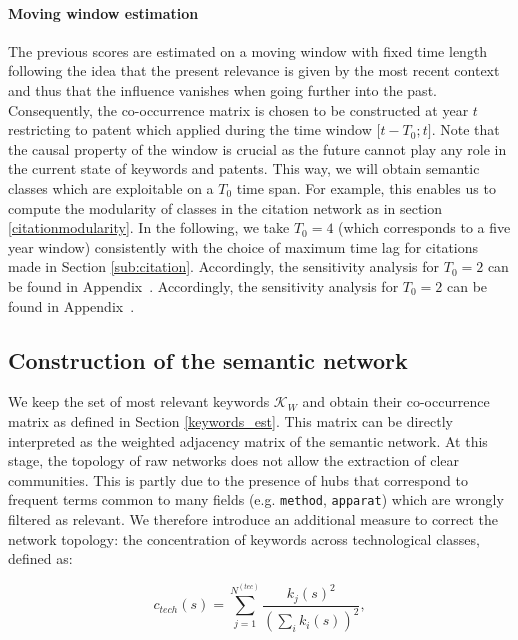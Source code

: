\documentclass[article]{article}%
\begin{document}
\paragraph{Moving window estimation}
The previous scores are estimated on a moving window with fixed time length following the idea that the present relevance is given by the most recent context and thus that the influence vanishes when going further into the past. Consequently, the co-occurrence matrix is chosen to be constructed at year $t$ restricting to patent which applied during the time window $\big[ t - T_0 ; t \big]$. Note that the causal property of the window is crucial as the future cannot play any role in the current state of keywords and patents. This way, we will obtain semantic classes which are exploitable on a $T_0$ time span. For example, this enables us to compute the modularity of classes in the citation network as in section \ref{citationmodularity}. In the following, we take $T_0 = 4$ (which corresponds to a five year window) consistently with the choice of maximum time lag for citations made in Section \ref{sub:citation}. Accordingly, the sensitivity analysis for $T_0=2$ can be found in Appendix~. Accordingly, the sensitivity analysis for $T_0=2$ can be found in Appendix~.

\subsection{Construction of the semantic network}
\label{construction}

We keep the set of most relevant keywords $\mathcal{K}_W$ and obtain their co-occurrence matrix as defined in Section \ref{keywords_est}. This matrix can be directly interpreted as the weighted adjacency matrix of the semantic network. At this stage, the topology of raw networks does not allow the extraction of clear communities. This is partly due to the presence of hubs that correspond to frequent terms common to many fields (e.g. \texttt{method}, \texttt{apparat}) which are wrongly filtered as relevant. We therefore introduce an additional measure to correct the network topology: the concentration of keywords across technological classes, defined as: 

$$c_{tech}(s) = \displaystyle \sum_{j=1}^{N^{(tec)}} \frac{k_j(s)^2}{ \left(\sum_i k_i(s)\right)^2},$$  
\end{document}

